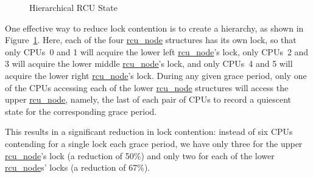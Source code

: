 \begin{figure}[htb]
\begin{center}
\end{center}
\caption{Hierarchical RCU State}
\label{fig:app:rcuimpl:rcutree:Hierarchical RCU State}
\end{figure}

One effective way to reduce lock contention is to create a hierarchy,
as shown in
Figure~\ref{fig:app:rcuimpl:rcutree:Hierarchical RCU State}.
Here, each of the four \url{rcu_node} structures has its own lock,
so that only CPUs~0 and 1 will acquire the lower left
\url{rcu_node}'s lock, only CPUs~2 and 3 will acquire the
lower middle \url{rcu_node}'s lock, and only CPUs~4 and 5
will acquire the lower right \url{rcu_node}'s lock.
During any given grace period,
only one of the CPUs accessing each of the lower \url{rcu_node}
structures will access the upper \url{rcu_node}, namely, the
last of each pair of CPUs to record a quiescent state for the corresponding
grace period.

This results in a significant reduction in lock contention:
instead of six CPUs contending for a single lock each grace period,
we have only three for the upper \url{rcu_node}'s lock 
(a reduction of 50\%) and only
two for each of the lower \url{rcu_node}s' locks (a reduction
of 67\%).

